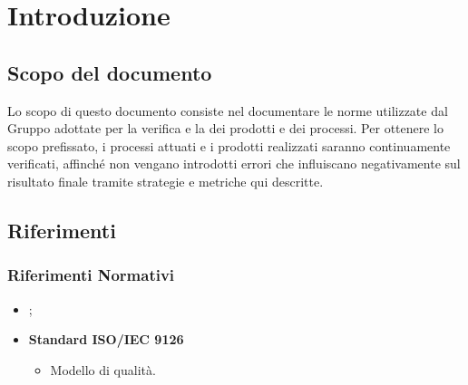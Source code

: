 \documentclass[PianoDiQualifica.tex]{subfiles}
\begin{document}
\chapter{Introduzione}

	\section{Scopo del documento}
	Lo scopo di questo documento consiste nel documentare le norme utilizzate dal Gruppo \gruppo adottate per la verifica e la  dei prodotti e dei processi. Per ottenere lo scopo prefissato, i processi attuati e i prodotti realizzati saranno continuamente verificati, affinché non vengano introdotti errori che influiscano negativamente sul risultato finale tramite strategie e metriche qui descritte.
	
	\scopoProdotto
	
	\glossExpl
	
	\section{Riferimenti}
		\subsection{Riferimenti Normativi}
		\begin{itemize}
			\item \textbf{\ndp \vrtre};
			\item \textbf{Standard ISO/IEC 9126}\\
			\begin{itemize}
				\item Modello di qualità.
			\end{itemize}
		\end{itemize}
		
\end{document}
